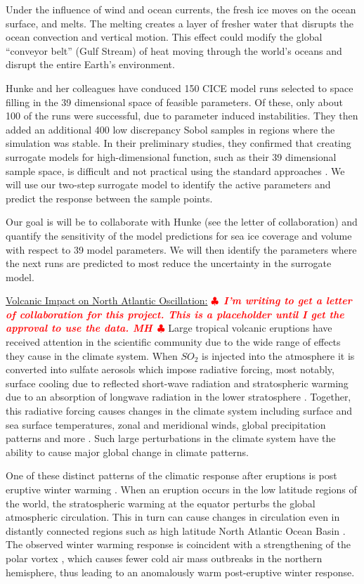 \documentclass[11pt]{NSFamsart}
\newif\ifnotesw \noteswtrue
\newcommand{\notes}[1]{\ifnotesw \textcolor{red}{  $\clubsuit$\ {\sf \bf \it  #1}\ $\clubsuit$  }\fi}
\begin{document}
Under the influence of wind and ocean currents, the  fresh ice moves on the ocean surface, and melts.  The melting creates a layer of fresher water that disrupts the ocean convection and vertical motion.  This effect could modify the global “conveyor belt” (Gulf Stream) of heat moving through the world’s oceans and disrupt the entire Earth's environment. 
   
Hunke and her colleagues have conduced 150 CICE model runs selected to space filling in the 39 dimensional  space of feasible  parameters.   Of these, only about 100 of the runs were successful, due to parameter induced instabilities.  They then added an additional 400 low discrepancy Sobol samples in regions where the simulation was stable.  In their preliminary studies, they confirmed that creating surrogate models for high-dimensional function, such as their 39 dimensional sample space, is difficult and not practical using the standard approaches \cite{bengio2006curse, o2010oxford}.  We will use our two-step surrogate model to identify the active parameters and predict the response between the sample points.  

Our goal is will be to collaborate with Hunke (see the letter of collaboration) and quantify the sensitivity of the model predictions for sea ice coverage and volume with respect to 39 model parameters.  We will then identify the parameters where the next runs are predicted to most reduce the uncertainty in the surrogate model.
    
  
\underline{Volcanic Impact on North Atlantic Oscillation:}\notes{I'm writing to get a letter of collaboration for this project. This is a placeholder until I get the approval to use the data. MH}
Large tropical volcanic eruptions have received attention in the scientific community due to the wide range of effects they cause in the climate system. When ${SO_2}$ is injected into the atmosphere it is converted into sulfate aerosols which impose radiative forcing, most notably, surface cooling due to reflected short-wave radiation and stratospheric warming due to an absorption of longwave radiation in the lower stratosphere \cite{zanchettin2013background}. Together, this radiative forcing causes changes in the climate system including surface and sea surface temperatures, zonal and meridional winds, global precipitation patterns and more \cite{legrande2015volcanic}.  Such large perturbations in the climate system have the ability to cause major global change in climate patterns.

One of these distinct patterns of the climatic response after eruptions is post eruptive winter warming \cite{zambri2017northern}. When an eruption occurs in the low latitude regions of the world, the stratospheric warming at the equator perturbs the global atmospheric circulation. This in turn can cause changes in circulation even in distantly connected regions such as high latitude North Atlantic Ocean Basin \cite{zambri2017northern}. The observed winter warming response is coincident with a strengthening of the polar vortex \cite{robock1995volcanic}, which causes fewer cold air mass outbreaks in the northern hemisphere, thus leading to an anomalously warm post-eruptive winter response.
\end{document}
